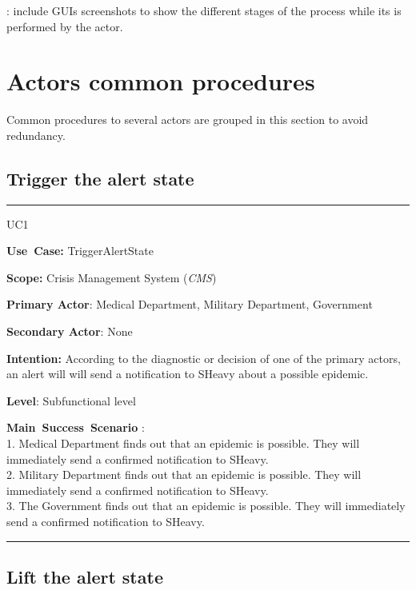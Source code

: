 : include GUIs screenshots to show the
different stages of the process while its is performed by the actor.



\section{Actors common procedures}
Common procedures to several actors are grouped in this section to avoid
redundancy.

\subsection{Trigger the alert state}

\vspace{0.5cm}
\hrule
\vspace{0.5cm}
\begin{lyxlist}{UC1}
\small{
\item [\textbf{Use~Case:}] TriggerAlertState
\item [\textbf{Scope:}] Crisis Management System (\emph{CMS})
\item [\textbf{Primary Actor}:] Medical Department, Military Department,
Government
\item [\textbf{Secondary Actor}:] None
\item [\textbf{Intention:}] According to the diagnostic or decision of one of
the primary actors, an alert will will send a notification to SHeavy about a
possible epidemic.
\item [\textbf{Level}:]Subfunctional level
\item [\textbf{Main~Success~Scenario}]:\\
1. Medical Department finds out that an epidemic is possible. They will
immediately send a confirmed notification to SHeavy.\\
2. Military Department finds out that an epidemic is possible. They will
immediately send a confirmed notification to SHeavy.\\
3. The Government finds out that an epidemic is possible. They will
immediately send a confirmed notification to SHeavy.\\
}
\end{lyxlist}
\hrule
\vspace{0.5cm} 

\subsection{Lift the alert state}


